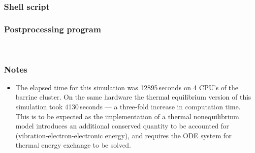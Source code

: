\pagebreak
\subsubsection{Shell script}
\label{finite-cyl-sh-files-2T}
\topbar

\bottombar


\subsubsection{Postprocessing program}
\label{finite-cyl-post-files}
\topbar

\bottombar\\
\topbar

\bottombar

\subsubsection{Notes}
\begin{itemize}
\item The elapsed time for this simulation was 12895\,seconds on 4 CPU's of the barrine cluster.
  On the same hardware the thermal equilibrium version of this simulation took 4130\,seconds --- 
  a three-fold increase in computation time.  This is to be expected as the implementation of a 
  thermal nonequilibrium model introduces an additional conserved quantity to be accounted for (vibration-electron-electronic energy), 
  and requires the ODE system for thermal energy exchange to be solved.
\end{itemize}

